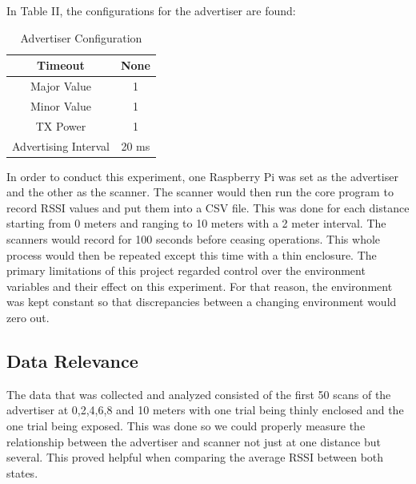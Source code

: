 \documentclass[letterpaper, 10 pt, conference]{ieeeconf}  %
\begin{document}
In Table II, the configurations for the advertiser are found:
\begin{table}[h]
\caption{Advertiser Configuration}
\label{table_example}
\begin{center}
\begin{tabular}{|c|c|}
\hline
Timeout & None\\
\hline
Major Value & 1\\
\hline
Minor Value & 1\\
\hline
TX Power & 1\\
\hline
Advertising Interval & 20 ms\\
\hline
\end{tabular}
\end{center}
\end{table}

In order to conduct this experiment, one Raspberry Pi was set as the advertiser and the other as the scanner. The scanner would then run the core program to record RSSI values and put them into a CSV file. This was done for each distance starting from 0 meters and ranging to 10 meters with a 2 meter interval. The scanners would record for 100 seconds before ceasing operations. This whole process would then be repeated except this time with a thin enclosure.
\smallbreak
The primary limitations of this project regarded control over the environment variables and their effect on this experiment. For that reason, the environment was kept constant so that discrepancies between a changing environment would zero out.
\subsection{Data Relevance}
The data that was collected and analyzed consisted of the first 50 scans of the advertiser at 0,2,4,6,8 and 10 meters with one trial being thinly enclosed and the one trial being exposed. This was done so we could properly measure the relationship between the advertiser and scanner not just at one distance but several. This proved helpful when comparing the average RSSI between both states.  
\end{document}
